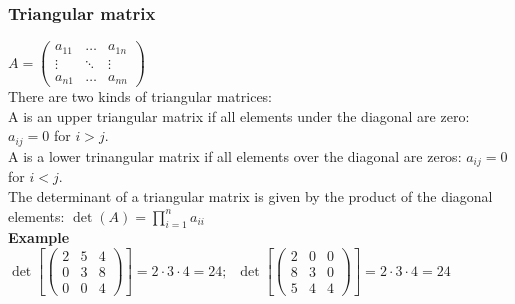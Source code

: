 \documentclass[10pt,a4paper]{article}
\begin{document}
\subsubsection{Triangular matrix}
$A = \left(\begin{array}{ccc}
a_{11} & \dots & a_{1n} \\
\vdots & \ddots & \vdots \\
a_{n1} & \dots & a_{nn}
\end{array}  \right)$\\
There are two kinds of triangular matrices:\\
A is an upper triangular matrix if all elements under the diagonal are zero: $a_{ij} =0 $ for $i > j$.\\
A is a lower trinangular matrix if all elements over the diagonal are zeros: $a_{ij}=0 $ for $i <j$.\\
The determinant of a triangular matrix is given by the product of the diagonal elements:
$\det(A)=\prod\limits_{i=1}^n a_{ii}$\\
\textbf{Example}\\
$\det \left[ \left( \begin{array}{ccc}
 2 & 5 & 4\\
 0 & 3 & 8\\
 0 & 0 & 4
\end{array} \right) \right] = 2 \cdot 3 \cdot 4 = 24; \;\;
\det \left[ \left( \begin{array}{ccc}
 2 & 0 & 0\\
 8 & 3 & 0\\
 5 & 4 & 4
\end{array} \right) \right] = 2 \cdot 3 \cdot 4 = 24$
\end{document}
